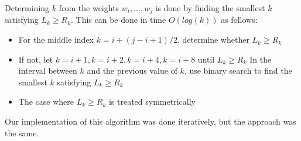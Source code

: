 Determining $k$ from the weights ${w_i, ..., w_j}$ is done by finding the smallest $k$ satisfying $L_k \ge R_k$. This can be done in time $O(log(k))$ as follows:

\begin{itemize}
	\item For the middle index $k=i+(j-i+1)/2$, determine whether $L_k \ge R_k$
	\item If not, let $k=i+1, k=i+2, k=i+4, k=i+8$ until $L_k \ge R_k$
	\subitem In the interval between $k$ and the previous value of $k$, use binary search to find the smallest $k$ satisfying $L_k \ge R_k$
	\item The case where $L_k \ge R_k$ is treated symmetrically
\end{itemize}

Our implementation of this algorithm was done iteratively, but the approach was the same.






